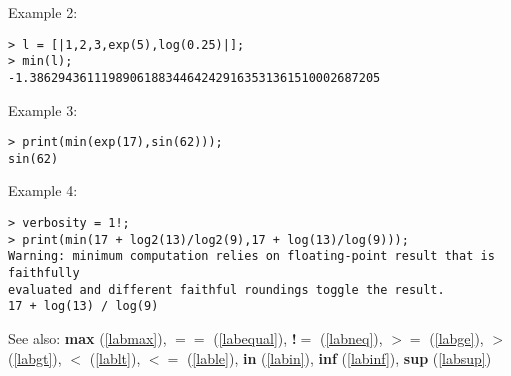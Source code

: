\noindent Example 2: 
\begin{center}\begin{minipage}{15cm}\begin{Verbatim}[frame=single]
> l = [|1,2,3,exp(5),log(0.25)|];
> min(l);
-1.3862943611198906188344642429163531361510002687205
\end{Verbatim}
\end{minipage}\end{center}
\noindent Example 3: 
\begin{center}\begin{minipage}{15cm}\begin{Verbatim}[frame=single]
> print(min(exp(17),sin(62)));
sin(62)
\end{Verbatim}
\end{minipage}\end{center}
\noindent Example 4: 
\begin{center}\begin{minipage}{15cm}\begin{Verbatim}[frame=single]
> verbosity = 1!;
> print(min(17 + log2(13)/log2(9),17 + log(13)/log(9)));
Warning: minimum computation relies on floating-point result that is faithfully 
evaluated and different faithful roundings toggle the result.
17 + log(13) / log(9)
\end{Verbatim}
\end{minipage}\end{center}
See also: \textbf{max} (\ref{labmax}), \textbf{$==$} (\ref{labequal}), \textbf{!$=$} (\ref{labneq}), \textbf{$>=$} (\ref{labge}), \textbf{$>$} (\ref{labgt}), \textbf{$<$} (\ref{lablt}), \textbf{$<=$} (\ref{lable}), \textbf{in} (\ref{labin}), \textbf{inf} (\ref{labinf}), \textbf{sup} (\ref{labsup})
